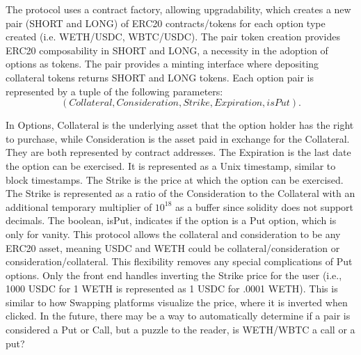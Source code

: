 The \greekfi protocol uses a contract factory, allowing upgradability, which creates a new pair (SHORT and LONG) of ERC20 contracts/tokens for each option type created (i.e. WETH/USDC, WBTC/USDC).
The pair token creation provides ERC20 composability in SHORT and LONG, a necessity in the adoption of options as tokens.
The pair provides a minting interface where depositing collateral tokens returns SHORT and LONG tokens.
Each option pair is represented by a tuple of the following parameters:
\begin{equation*}
  (Collateral, Consideration, Strike, Expiration, isPut).
\end{equation*}

In Options, Collateral is the underlying asset that the option holder has the right to purchase, while Consideration is the asset paid in exchange for the Collateral. They are both represented by contract addresses.
The Expiration is the last date the option can be exercised. 
It is represented as a Unix timestamp, similar to block timestamps.
The Strike is the price at which the option can be exercised.
The Strike is represented as a ratio of the Consideration to the Collateral with an additional temporary multiplier of $10^{18}$ as a buffer since solidity does not support decimals.
The boolean, isPut, indicates if the option is a Put option, which is only for vanity. 
This protocol allows the collateral and consideration to be any ERC20 asset, meaning USDC and WETH could be collateral/consideration or consideration/collateral. 
This flexibility removes any special complications of Put options. 
Only the front end handles inverting the Strike price for the user (i.e., 1000 USDC for 1 WETH is represented as 1 USDC for .0001 WETH). This is similar to how Swapping platforms visualize the price, where it is inverted when clicked. In the future, there may be a way to automatically determine if a pair is considered a Put or Call, but a puzzle to the reader, is WETH/WBTC a call or a put?
